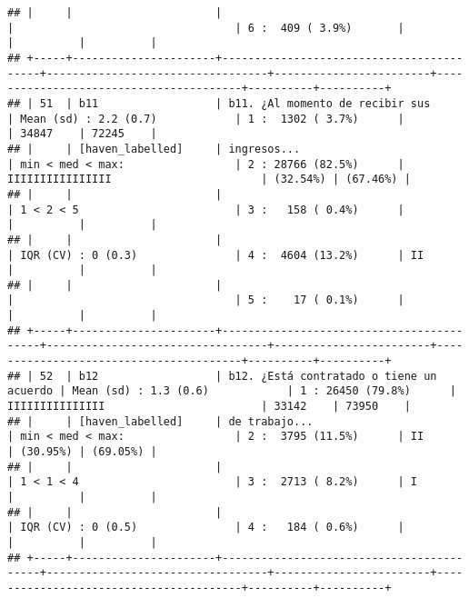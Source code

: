 \documentclass[]{article}
\begin{document}
\begin{verbatim}
## |     |                      |                                          |                                  | 6 :  409 ( 3.9%)       |                                        |          |          |
## +-----+----------------------+------------------------------------------+----------------------------------+------------------------+----------------------------------------+----------+----------+
## | 51  | b11                  | b11. ¿Al momento de recibir sus          | Mean (sd) : 2.2 (0.7)            | 1 :  1302 ( 3.7%)      |                                        | 34847    | 72245    |
## |     | [haven_labelled]     | ingresos...                              | min < med < max:                 | 2 : 28766 (82.5%)      | IIIIIIIIIIIIIIII                       | (32.54%) | (67.46%) |
## |     |                      |                                          | 1 < 2 < 5                        | 3 :   158 ( 0.4%)      |                                        |          |          |
## |     |                      |                                          | IQR (CV) : 0 (0.3)               | 4 :  4604 (13.2%)      | II                                     |          |          |
## |     |                      |                                          |                                  | 5 :    17 ( 0.1%)      |                                        |          |          |
## +-----+----------------------+------------------------------------------+----------------------------------+------------------------+----------------------------------------+----------+----------+
## | 52  | b12                  | b12. ¿Está contratado o tiene un acuerdo | Mean (sd) : 1.3 (0.6)            | 1 : 26450 (79.8%)      | IIIIIIIIIIIIIII                        | 33142    | 73950    |
## |     | [haven_labelled]     | de trabajo...                            | min < med < max:                 | 2 :  3795 (11.5%)      | II                                     | (30.95%) | (69.05%) |
## |     |                      |                                          | 1 < 1 < 4                        | 3 :  2713 ( 8.2%)      | I                                      |          |          |
## |     |                      |                                          | IQR (CV) : 0 (0.5)               | 4 :   184 ( 0.6%)      |                                        |          |          |
## +-----+----------------------+------------------------------------------+----------------------------------+------------------------+----------------------------------------+----------+----------+

\end{verbatim}
\end{document}

